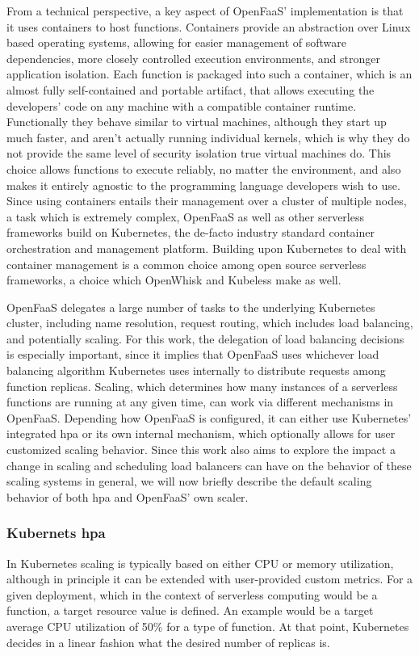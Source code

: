 From a technical perspective, a key aspect of OpenFaaS' implementation is that it uses containers to host functions.
Containers provide an abstraction over Linux based operating systems, allowing for easier management of software dependencies, more closely controlled execution environments, and stronger application isolation.
Each function is packaged into such a container, which is an almost fully self-contained and portable artifact, that allows executing the developers' code on any machine with a compatible container runtime.
Functionally they behave similar to virtual machines, although they start up much faster, and aren't actually running individual kernels, which is why they do not provide the same level of security isolation true virtual machines do.
This choice allows functions to execute reliably, no matter the environment, and also makes it entirely agnostic to the programming language developers wish to use.
Since using containers entails their management over a cluster of multiple nodes, a task which is extremely complex, OpenFaaS\cite{openfaas} as well as other serverless frameworks build on Kubernetes\cite{kubernetes}, the de-facto industry standard container orchestration and management platform.
Building upon Kubernetes to deal with container management is a common choice among open source serverless frameworks, a choice which OpenWhisk and Kubeless make as well\cite{mohantyEvaluationOpenSource2018}.

OpenFaaS delegates a large number of tasks to the underlying Kubernetes cluster, including name resolution, request routing, which includes load balancing, and potentially scaling.
For this work, the delegation of load balancing decisions is especially important, since it implies that OpenFaaS uses whichever load balancing algorithm Kubernetes uses internally to distribute requests among function replicas.
Scaling, which determines how many instances of a serverless functions are running at any given time, can work via different mechanisms in OpenFaaS.
Depending how OpenFaaS is configured, it can either use Kubernetes' integrated \gls{hpa}\cite{kubernetes-hpa} or its own internal mechanism, which optionally allows for user customized scaling behavior\cite{openfaas-autoscaling}.
Since this work also aims to explore the impact a change in scaling and scheduling load balancers can have on the behavior of these scaling systems in general, we will now briefly describe the default scaling behavior of both \gls{hpa} and OpenFaaS' own scaler.

\subsubsection{Kubernets \gls{hpa}}
In Kubernetes scaling is typically based on either CPU or memory utilization, although in principle it can be extended with user-provided custom metrics\cite{kubernetes-hpa}.
For a given deployment, which in the context of serverless computing would be a function, a target resource value is defined.
An example would be a target average CPU utilization of 50\% for a type of function.
At that point, Kubernetes decides in a linear fashion what the desired number of replicas is.


